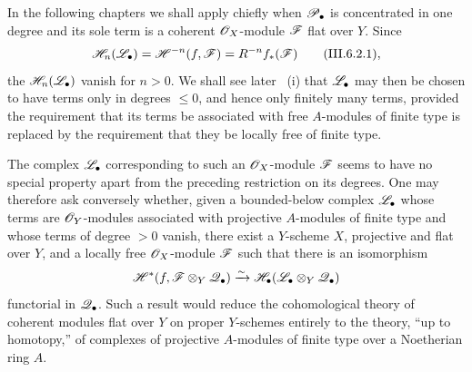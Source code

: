 \begin{remark}[6.10.6]
\label{III.6.10.6}
In the following chapters we shall apply 
chiefly when $\mathscr{P}_\bullet$ is concentrated in one degree and
its sole term is a coherent $\mathscr{O}_X$-module $\mathscr{F}$ flat over
$Y$.  Since
\[
  \mathscr{H}_n(\mathscr{L}_\bullet)
  =
  \mathscr{H}^{-n}(f,\mathscr{F})
  =
  R^{-n}f_*(\mathscr{F})
  \qquad\text{(III.6.2.1)},
\]
the $\mathscr{H}_n(\mathscr{L}_\bullet)$ vanish for $n>0$.  We shall see
later ~(i) that $\mathscr{L}_\bullet$ may then be
chosen to have terms only in degrees $\leq0$, and hence only
finitely many terms, provided the requirement that its terms
be associated with free $A$-modules of finite type is replaced
by the requirement that they be locally free of finite type.

The complex $\mathscr{L}_\bullet$ corresponding to such an
$\mathscr{O}_X$-module $\mathscr{F}$ seems to have no special property
apart from the preceding restriction on its degrees.  One may
therefore ask conversely whether, given a bounded-below complex
$\mathscr{L}_\bullet$ whose terms are $\mathscr{O}_Y$-modules associated
with projective $A$-modules of finite type and whose terms of
degree $>0$ vanish, there exist a $Y$-scheme $X$, projective and
flat over $Y$, and a locally free $\mathscr{O}_X$-module $\mathscr{F}$ such
that there is an isomorphism
\[
  \mathscr{H}^*
  (f,\mathscr{F}\otimes_Y\mathscr{Q}_\bullet)
  \xrightarrow{\sim}
  \mathscr{H}_\bullet
  (\mathscr{L}_\bullet\otimes_Y\mathscr{Q}_\bullet)
\]
functorial in $\mathscr{Q}_\bullet$.  Such a result would reduce the
cohomological theory of coherent modules flat over $Y$ on
proper $Y$-schemes entirely to the theory, ``up to homotopy,''
of complexes of projective $A$-modules of finite type over a
Noetherian ring $A$.
\end{remark}
